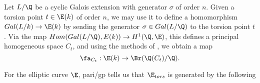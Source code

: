 Let $L/\Q$ be a cyclic Galois extension with generator $\sigma$ of order
$n$. Given a torsion point $t \in \E(k)$ of order $n$, we may use it to
define a homomorphism $Gal(L/k) \to \E(k)$ by sending
the generator $\sigma \in Gal(L/\Q)$ to the torsion point $t$. Via the
map $Hom(Gal(L/\Q),E(k)) \to H^1(\Q, \E)$, this defines a principal
homogeneous space $C_t$, and using the methods of \cite{CiKra}, we obtain
a map
\[\fa_{C_t} : \E(k) \to \Br(\Q(C_t) / \Q).\]

For the elliptic curve $\E$, pari/gp tells us that $\E_{tors}$ is
generated by the following
